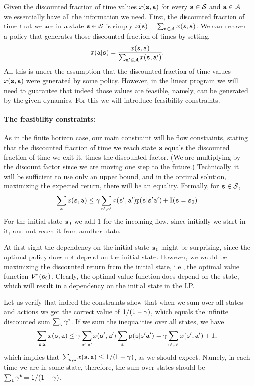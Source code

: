 
Given the discounted fraction of time values  $x({\tt s},{\tt a})$ for every ${\tt s}\in\mathcal{S}$ and ${\tt a}\in\mathcal{A}$ we essentially have all the information we need. First, the discounted fraction of time that we are in a state ${\tt s}\in\mathcal{S}$ is simply $x({\tt s})=\sum_{{\tt a}\in\mathcal{A}}x({\tt s},{\tt a})$.
We can recover a policy that generates those discounted fraction of times by setting,
\[
\pi({\tt a}|{\tt s})=\frac{x({\tt s},{\tt a})}{\sum_{{\tt a}'\in\mathcal{A}}x({\tt s},{\tt a}')}.
\]
All this is under the assumption that the discounted fraction of time values $x({\tt s},{\tt a})$ were generated by some policy. However, in the linear program we will need to guarantee that indeed those values are feasible, namely, can be generated by the given dynamics. For this we will introduce feasibility constraints.

\paragraph{The feasibility constraints:}
As in the finite horizon case, our main constraint will be flow constraints, stating that the discounted fraction of time we reach state ${\tt s}$ equals the discounted fraction of time we exit it, times the discounted factor. (We are multiplying by the discount factor since we are moving one step to the future.) Technically, it will be sufficient to use only an upper bound, and in the optimal solution, maximizing the expected return, there will be an equality. Formally, for ${\tt s}\in\mathcal{S}$,
\[
\sum_{{\tt a}} x({\tt s},{\tt a})\leq \gamma
\sum_{{\tt s}',{\tt a}'}
x({\tt s}',{\tt a}'){\tt p}({\tt s}|{\tt s}'{\tt a}')+\mathbb{I}({\tt s}={\tt s}_0)
\]
For the initial state ${\tt s}_0$ we add $1$ for the incoming flow, since initially we start in it, and not reach it from another state.

At first sight the dependency on the initial state ${\tt s}_0$ might be surprising, since the optimal policy does not depend on the initial state. However, we would be maximizing the discounted return from the initial state, i.e., the optimal value function $\mathcal{V}^*({\tt s}_0)$. Clearly, the optimal value function does depend on the state, which will result in a dependency on the initial state in the LP.

Let us verify that indeed the constraints show that when we sum over all states and actions  we get the correct value of $1/(1-\gamma)$, which equals the infinite discounted sum $\sum_{\tt t}\gamma^{\tt t}$.
If we sum the inequalities over all states, we have
\[
\sum_{{\tt s},{\tt a}} x({\tt s},{\tt a})\leq\gamma
\sum_{{\tt s}',{\tt a}'} x({\tt s}',{\tt a}')\sum_{\tt s}
{\tt p}({\tt s}|{\tt s}'{\tt a}')=\gamma \sum_{{\tt s}',{\tt a}'}
x({\tt s}',{\tt a}')+1,\]
%
which implies that $\sum_{{\tt s},{\tt a}} x({\tt s},{\tt a})\leq
1/(1-\gamma)$, as we should expect. Namely, in each time we are
in some state, therefore, the sum over states should be $\sum_{\tt t}
\gamma^{\tt t}=1/(1-\gamma)$.

